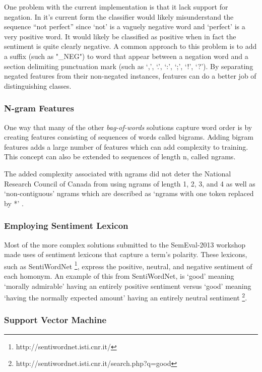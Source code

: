 \documentclass[final,3p,12pt]{elsarticle}
\begin{document}
One problem with the current implementation is that it lack support for
negation. In it's current form the classifier would likely misunderstand the
sequence ``not perfect'' since `not' is a vaguely negative word and `perfect'
is a very positive word. It would likely be classified as positive when in fact
the sentiment is quite clearly negative. A common approach to this problem is
to add a suffix (such as "\_NEG") to word that appear between a negation word
and a section delimiting punctuation mark (such as `,', `.', `:', `;', `!',
`?'). By separating negated features from their non-negated instances, features
can do a better job of distinguishing classes.

\subsubsection{N-gram Features}
\label{sssection:ngram}

One way that many of the other \textit{bag-of-words} solutions capture word order is by
creating features consisting of sequences of words called bigrams. Adding
bigram features adds a large number of features which can add complexity to
training. This concept can also be extended to sequences of length n, called
ngrams.

The added complexity associated with ngrams did not deter the National Research
Council of Canada from using ngrams of length 1, 2, 3, and 4 as well as
`non-contiguous' ngrams which are described as `ngrams with one token replaced
by *' \cite{Mohammad2013}.

\subsubsection{Employing Sentiment Lexicon}
\label{sssection:sentimentlexicon}

Most of the more complex solutions submitted to the SemEval-2013 workshop made
uses of sentiment lexicons that capture a term's polarity. These lexicons, such
as SentiWordNet \footnote{http://sentiwordnet.isti.cnr.it/}, express the
positive, neutral, and negative sentiment of each homonym. An example of this
from SentiWordNet, is `good' meaning `morally admirable' having an entirely
positive sentiment versus `good' meaning `having the normally expected amount'
having an entirely neutral sentiment
\footnote{http://sentiwordnet.isti.cnr.it/search.php?q=good}.

\subsubsection{Support Vector Machine}
\label{sssection:svm}
\end{document}
